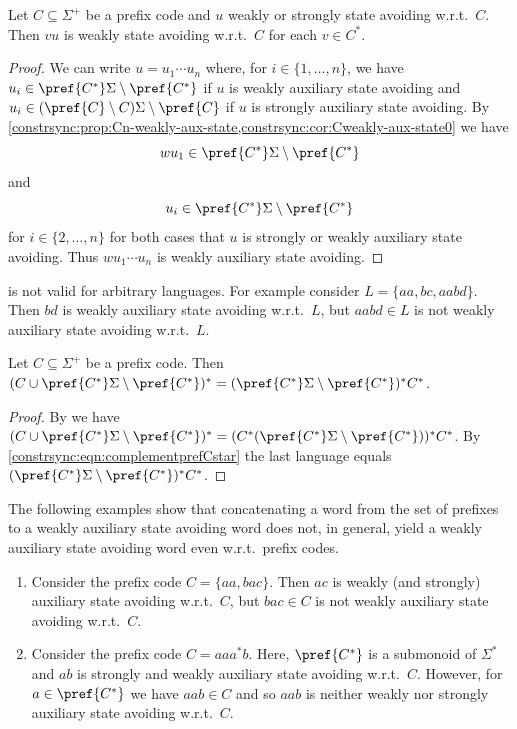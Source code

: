 \begin{corollary}  \label{constrsync:cor:Cn-weakly-aux-state}
	Let $C \subseteq \Sigma^+$ be a prefix code
	and $u$ weakly or strongly state avoiding w.r.t.~$C$.
	Then $vu$ is weakly state avoiding w.r.t.~$C$ for each $v \in C^*$.
\end{corollary}
\begin{proof}
	We can write $u = u_1 \cdots u_n$
	where, for $i \in \{1,\ldots,n\}$,
	we have $u_i \in \pref{C^*}\Sigma \setminus \pref{C^*}$ 
	if $u$ is weakly auxiliary state avoiding
	and $u_i \in (\pref{C}\setminus C)\Sigma \setminus \pref{C}$
	if $u$ is strongly auxiliary state avoiding. 
	By \cref{constrsync:prop:Cn-weakly-aux-state,constrsync:cor:Cweakly-aux-state0} we have
	\[
	wu_1 \in \pref{C^*}\Sigma \setminus \pref{C^*}
	\]
	and
	\[
	u_i \in \pref{C^*}\Sigma \setminus \pref{C^*}
	\]
	for $i \in \{2,\ldots,n\}$ for both cases that $u$ is strongly or weakly
	auxiliary state avoiding.
	Thus $wu_1 \cdots u_n$ is weakly auxiliary state avoiding.
\end{proof}

\begin{example}
	is not valid for arbitrary languages.
	For example consider $L = \{aa,bc,aabd\}$.
	Then $bd$ is weakly auxiliary state avoiding w.r.t.~$L$,
	but $aabd \in L$ is not weakly auxiliary state avoiding 
	w.r.t.~$L$.
\end{example}

\begin{corollary}
		Let $C \subseteq \Sigma^+$ be a prefix code.
		Then $( C \cup \pref{C^*}\Sigma \setminus \pref{C^*} )^* = (\pref{C^*}\Sigma \setminus \pref{C^*} )^*C^*$.
\end{corollary}
\begin{proof} 
	By 
	we have 
	$( C \cup \pref{C^*}\Sigma \setminus \pref{C^*} )^* = (C^* ( \pref{C^*}\Sigma \setminus \pref{C^*} ) )^* C^*$.
	By \cref{constrsync:eqn:complementprefCstar} 
	the last language equals 
	$( \pref{C^*}\Sigma \setminus \pref{C^*} )^* C^*$.
\end{proof} 

The following examples show that concatenating a word
from the set of prefixes to a weakly auxiliary state avoiding
word does not, in general, yield a weakly auxiliary state
avoiding word even w.r.t.~prefix codes.

\begin{example}
\begin{enumerate}
\item Consider the prefix code $C = \{aa,bac\}$.
Then $ac$ is weakly (and strongly) auxiliary state avoiding w.r.t.~$C$,
but $bac \in C$ is not weakly auxiliary state avoiding w.r.t.~$C$.

\item Consider the prefix code $C = aaa^*b$. 
Here,  $\pref{C^*}$
is a submonoid of $\Sigma^*$ 
and $ab$ is strongly and weakly 
auxiliary state avoiding w.r.t.~$C$. However, for  $a \in \pref{C^*}$ we have $aab \in C$
and so $aab$ is neither weakly nor strongly auxiliary state avoiding w.r.t.~$C$.
\end{enumerate}
\end{example}

